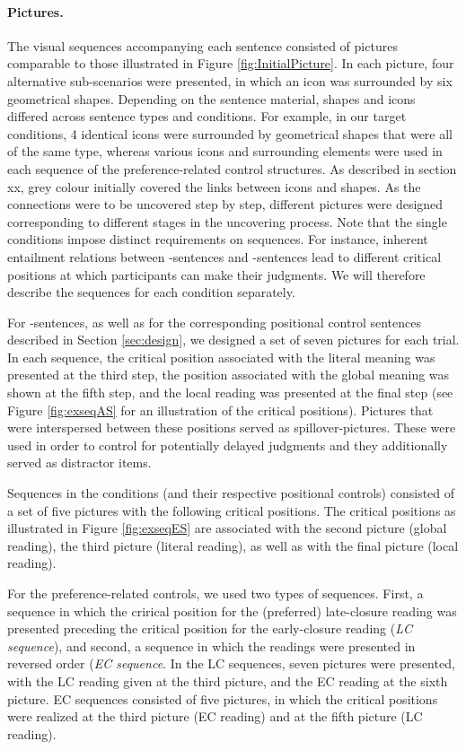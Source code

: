 \documentclass[fleqn,reqno,10pt,draft]{article}
\newcommand{\as}{\acro{as}}
\renewcommand{\es}{\acro{es}}
\begin{document}
\paragraph{Pictures.}
The visual sequences accompanying each sentence consisted of pictures
comparable to those illustrated in Figure \ref{fig:InitialPicture}. In
each picture, four alternative sub-scenarios were presented, in which
an icon was surrounded by six geometrical shapes. Depending on the
sentence material, shapes and icons differed across sentence types and
conditions. For example, in our target conditions, 4 identical icons
were surrounded by geometrical shapes that were all of the same type,
whereas various icons and surrounding elements were used in each
sequence of the preference-related control structures. As described in
section xx, grey colour initially covered the links between icons and
shapes. As the connections were to be uncovered step by step,
different pictures were designed corresponding to different stages in
the uncovering process. Note that the single conditions impose
distinct requirements on sequences. For instance, inherent entailment
relations between \as-sentences and \es-sentences lead to different
critical positions at which participants can make their judgments. We
will therefore describe the sequences for each condition separately.

For \as-sentences, as well as for the corresponding positional control
sentences described in Section \ref{sec:design}, we designed a set of
seven pictures for each trial. In each sequence, the critical position
associated with the literal meaning was presented at the third step,
the position associated with the global meaning was shown at the fifth
step, and the local reading was presented at the final step (see
Figure \ref{fig:exseqAS} for an illustration of the critical
positions). Pictures that were interspersed between these positions
served as spillover-pictures. These were used in order to control for
potentially delayed judgments and they additionally served as
distractor items.

Sequences in the \es conditions (and their respective positional
controls) consisted of a set of five pictures with the following
critical positions. The critical positions as illustrated in Figure
\ref{fig:exseqES} are associated with the second picture (global
reading), the third picture (literal reading), as well as with the
final picture (local reading).

For the preference-related controls, we used two types of
sequences. First, a sequence in which the crirical position for the
(preferred) late-closure reading was presented preceding the critical
position for the early-closure reading ({\it LC sequence}), and
second, a sequence in which the readings were presented in reversed
order ({\it EC sequence}. In the LC sequences, seven pictures were
presented, with the LC reading given at the third picture, and the EC
reading at the sixth picture. EC sequences consisted of five pictures,
in which the critical positions were realized at the third picture (EC
reading) and at the fifth picture (LC reading).
\end{document}
